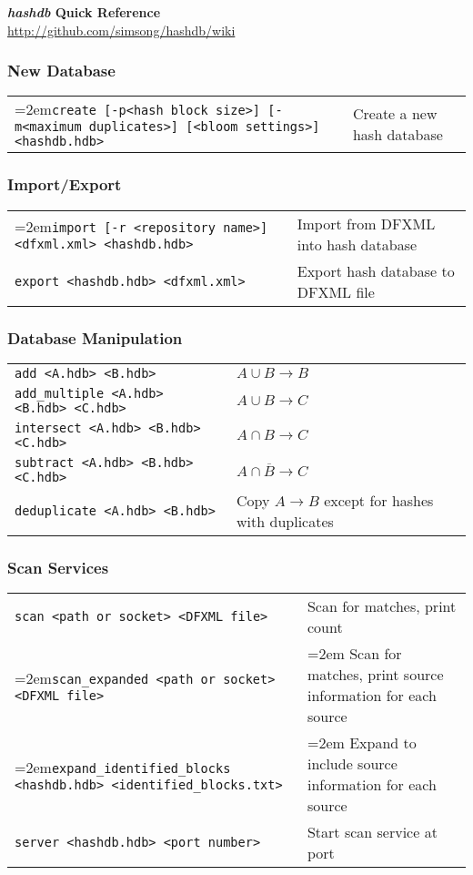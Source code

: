 \documentclass[12pt]{article}
\newcommand{\hdb}{\emph{hashdb}\xspace}
\begin{document}
\begin{center}
\textbf{\Large \hdb Quick Reference} \\
\url{http://github.com/simsong/hashdb/wiki}
\end{center}

\subsubsection*{New Database}
\begin{tabular}{p{8 cm} p{9 cm} }
\hangindent=2em\texttt{create [-p<hash block size>] [-m<maximum duplicates>] [<bloom settings>] <hashdb.hdb>} & Create a new hash database \\
\end{tabular}

\subsubsection*{Import/Export}
\begin{tabular}{p{8 cm} p{9 cm} }
\hangindent=2em\texttt{import [-r <repository name>] <dfxml.xml> <hashdb.hdb>} & Import from DFXML into hash database \\
\texttt{export <hashdb.hdb> <dfxml.xml>} & Export hash database to DFXML file \\
\end{tabular}

\subsubsection*{Database Manipulation}
\begin{tabular}{p{8 cm} p{9 cm} }
\texttt{add <A.hdb> <B.hdb>} & $A \cup B \rightarrow B$ \\
\texttt{add\_multiple <A.hdb> <B.hdb> <C.hdb>} & $A \cup B \rightarrow C$ \\
\texttt{intersect <A.hdb> <B.hdb> <C.hdb>} & $A \cap B \rightarrow C$ \\
\texttt{subtract <A.hdb> <B.hdb> <C.hdb>} & $A \cap \overline B \rightarrow C$ \\
\texttt{deduplicate <A.hdb> <B.hdb>} & Copy $A \rightarrow B$ except for hashes with duplicates \\
\end{tabular}

\subsubsection*{Scan Services}
\begin{tabular}{p{8 cm} p{9 cm} }
\texttt{scan <path or socket> <DFXML file>} & Scan for matches, print count\\
\hangindent=2em\texttt{scan\_expanded <path or socket> <DFXML file>} & \hangindent=2em Scan for matches, print source information for each source \\
\hangindent=2em\texttt{expand\_identified\_blocks <hashdb.hdb> <identified\_blocks.txt>} & \hangindent=2em Expand to include source information for each source \\
\texttt{server <hashdb.hdb> <port number>} & Start scan service at port \\
\end{tabular}
\end{document}
